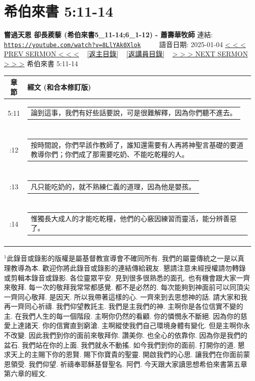 \documentclass{book}
\begin{document}
\section{希伯來書 5:11-14}
\label{sec:8LlYAk0Xlok}
\textbf{嘗過天恩 卻長蒺藜 (希伯來書5\_11-14;6\_1-12) - 蕭壽華牧師}
\newline
\newline
連結: \href{https://youtube.com/watch?v=8LlYAk0Xlok}{\texttt{https://youtube.com/watch?v=8LlYAk0Xlok}} ~~~~ 語音日期: 2025-01-04
\newline
\newline
\hyperref[sec:toZa1ewaUWE]{< < < PREV SERMON < < <}
~
\hyperlink{toc}{[返主目錄]}
~
\hyperref[ch:preacher9]{[返講員目錄]}
~
\hyperref[sec:QwQqFfjJiJo]{> > > NEXT SERMON > > >}
\newline
\newline
希伯來書 5:11-14
\newline
\begin{longtable}{cl}
\hline
\hline
章節 & 經文 (和合本修訂版)\\
\hline
5:11 & \begin{tabularx}{0.7\textwidth}{X} 論到這事，我們有好些話要說，可是很難解釋，因為你們聽不進去。 \end{tabularx} \\ \\ \relax
5:12 & \begin{tabularx}{0.7\textwidth}{X} 按時間說，你們早該作教師了，誰知還需要有人再將神聖言基礎的要道教導你們；你們成了那需要吃奶、不能吃乾糧的人。 \end{tabularx} \\ \\ \relax
5:13 & \begin{tabularx}{0.7\textwidth}{X} 凡只能吃奶的，就不熟練仁義的道理，因為他是嬰孩。 \end{tabularx} \\ \\ \relax
5:14 & \begin{tabularx}{0.7\textwidth}{X} 惟獨長大成人的才能吃乾糧，他們的心竅因練習而靈活，能分辨善惡了。 \end{tabularx} \\ \\
[1ex]
\hline
\hline
\end{longtable}
$^{1}$此錄音或錄影的版權是屬基督教宣導會不確同所有.
我們的屬靈傳統之一是以真理教導為本.
歡迎你將此錄音或錄影的連結傳給親友.
懇請注意未經授權請勿轉錄或剪輯本錄音或錄影.
各位靈眾平安.
見到很多很熟悉的面孔.
也有機會跟大家一齊來敬拜.
每一次的敬拜我常常都感覺.
都不是必然的.
每次能夠到神面前可以同頂尖一齊同心敬拜.
是因天.
所以我帶著這樣的心.
一齊來到去思想神的話.
請大家和我再一齊同心祈禱.
我們仰望教託主.
我們是主我們的神.
主啊你是各位信實不變的主.
在我們人生的每一個階段.
主啊你仍然的看顧.
你的憐憫永不斷絕.
因為你的慈愛上達諸天.
你的信實直到窮滄.
主啊縱使我們自己環境身體有變化.
但是主啊你永不改變.
因此我們到你的面前來敬拜你.
讚美你.
也全心的依靠你.
因為你是我們的盆石.
我們站在你的上面.
我們就永不動搖.
如今我們到你的面前.
打開你的道.
懇求天上的主賜下你的恩賢.
賜下你寶貴的聖靈.
開啟我們的心思.
讓我們在你面前蒙恩領受.
我們仰望.
祈禱奉耶穌基督聖名.
阿們.
今天跟大家讀思想希伯來書第五章第六章的經文.
\end{document}
